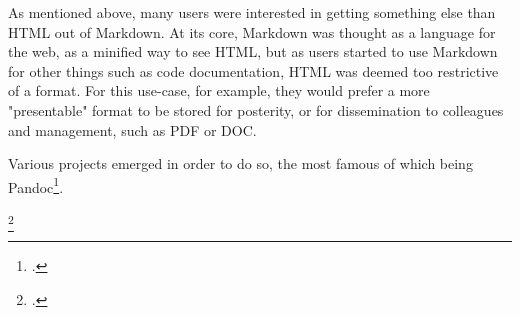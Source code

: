 As mentioned above, many users were interested in getting something else than HTML out of Markdown. At its core, Markdown was thought as
a language for the web, as a minified way to see HTML, but as users started to use Markdown for other things such as code documentation,
HTML was deemed too restrictive of a format. For this use-case, for example, they would prefer a more "presentable" format to be stored
for posterity, or for dissemination to colleagues and management, such as PDF or DOC.\newline

Various projects emerged in order to do so, the most famous of which being Pandoc\footcite{pandoc}.

\footcite{dominici2014overview}

